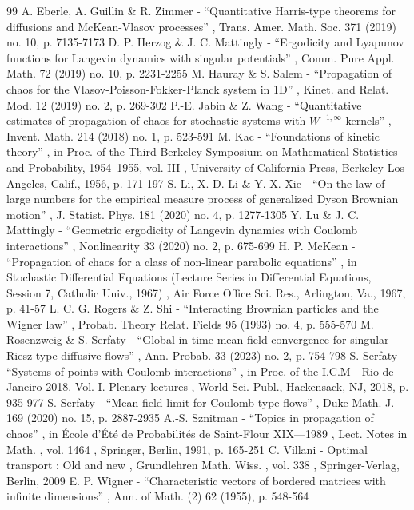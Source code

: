 \documentclass[11pt]{article}
\theoremstyle{plain}
\theoremstyle{definition}
\begin{document}
\begin{thebibliography}{99}
 A. Eberle, A. Guillin \& R. Zimmer - “Quantitative Harris-type theorems for diffusions and McKean-Vlasov processes” , Trans. Amer. Math. Soc. 371 (2019) no. 10, p. 7135-7173
 D. P. Herzog \& J. C. Mattingly - “Ergodicity and Lyapunov functions for Langevin dynamics with singular potentials” , Comm. Pure Appl. Math. 72 (2019) no. 10, p. 2231-2255
 M. Hauray \& S. Salem - “Propagation of chaos for the Vlasov-Poisson-Fokker-Planck system in 1D” , Kinet. and Relat. Mod. 12 (2019) no. 2, p. 269-302
 P.-E. Jabin \& Z. Wang - “Quantitative estimates of propagation of chaos for stochastic systems with $W^{-1,\infty }$ kernels” , Invent. Math. 214 (2018) no. 1, p. 523-591
 M. Kac - “Foundations of kinetic theory” , in Proc. of the Third Berkeley Symposium on Mathematical Statistics and Probability, 1954–1955, vol. III , University of California Press, Berkeley-Los Angeles, Calif., 1956, p. 171-197
 S. Li, X.-D. Li \& Y.-X. Xie - “On the law of large numbers for the empirical measure process of generalized Dyson Brownian motion” , J. Statist. Phys. 181 (2020) no. 4, p. 1277-1305
 Y. Lu \& J. C. Mattingly - “Geometric ergodicity of Langevin dynamics with Coulomb interactions” , Nonlinearity 33 (2020) no. 2, p. 675-699
 H. P. McKean - “Propagation of chaos for a class of non-linear parabolic equations” , in Stochastic Differential Equations (Lecture Series in Differential Equations, Session 7, Catholic Univ., 1967) , Air Force Office Sci. Res., Arlington, Va., 1967, p. 41-57
 L. C. G. Rogers \& Z. Shi - “Interacting Brownian particles and the Wigner law” , Probab. Theory Relat. Fields 95 (1993) no. 4, p. 555-570
 M. Rosenzweig \& S. Serfaty - “Global-in-time mean-field convergence for singular Riesz-type diffusive flows” , Ann. Probab. 33 (2023) no. 2, p. 754-798
 S. Serfaty - “Systems of points with Coulomb interactions” , in Proc. of the I.C.M—Rio de Janeiro 2018. Vol. I. Plenary lectures , World Sci. Publ., Hackensack, NJ, 2018, p. 935-977
 S. Serfaty - “Mean field limit for Coulomb-type flows” , Duke Math. J. 169 (2020) no. 15, p. 2887-2935
 A.-S. Sznitman - “Topics in propagation of chaos” , in École d’Été de Probabilités de Saint-Flour XIX—1989 , Lect. Notes in Math. , vol. 1464 , Springer, Berlin, 1991, p. 165-251
 C. Villani - Optimal transport : Old and new , Grundlehren Math. Wiss. , vol. 338 , Springer-Verlag, Berlin, 2009
 E. P. Wigner - “Characteristic vectors of bordered matrices with infinite dimensions” , Ann. of Math. (2) 62 (1955), p. 548-564
\end{thebibliography}
\end{document}
